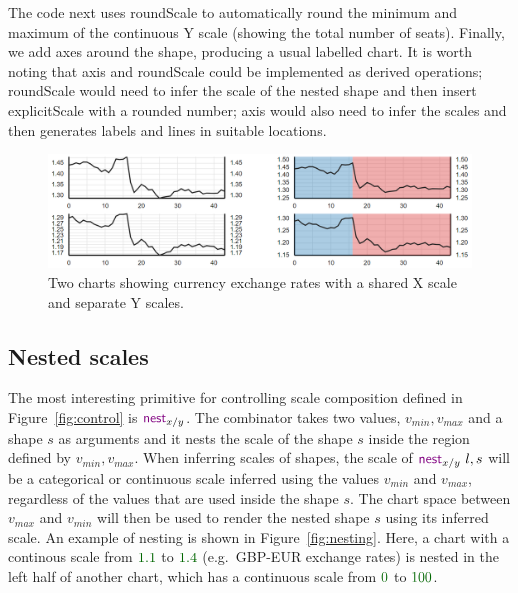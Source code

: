 \documentclass{jfp}
\newcommand{\num}[1]{\textcolor{numclr}{#1}}
\newcommand{\kvd}[1]{\textnormal{\textcolor{kvdclr}{\sffamily #1}}}
\begin{document}
The code next uses \kvd{roundScale} to automatically round the minimum and maximum of the
continuous Y scale (showing the total number of seats). Finally, we add axes around the shape,
producing a usual labelled chart.  It is worth noting that \kvd{axis} and \kvd{roundScale}
could be implemented as derived operations; \kvd{roundScale} would need to infer the scale of
the nested shape and then insert \kvd{explicitScale} with a rounded number; \kvd{axis}
would also need to infer the scales and then generates labels and lines in suitable locations.

\begin{figure}
\includegraphics[scale=0.57]{figures/lines}
\vspace{0.25em}
\caption{Two charts showing currency exchange rates with a shared X scale and separate Y scales.}
\label{fig:lines}
\end{figure}

\subsection{Nested scales}

The most interesting primitive for controlling scale composition defined in Figure~\ref{fig:control}
is $\kvd{nest}_{x/y}$. The combinator takes two values, $v_{min}, v_{max}$ and a shape $s$ as arguments
and it nests the scale of the shape $s$ inside the region defined by $v_{min}, v_{max}$. When inferring
scales of shapes, the scale of $\kvd{nest}_{x/y}~l, s$ will be a categorical or continuous scale
inferred using the values $v_{min}$ and $v_{max}$, regardless of the values that are used inside
the shape $s$. The chart space between $v_{max}$ and $v_{min}$ will then be used to render the
nested shape $s$ using its inferred scale. An example of nesting is shown in Figure~\ref{fig:nesting}.
Here, a chart with a continous scale from $\num{1.1}$ to $\num{1.4}$ (e.g.~GBP-EUR exchange rates)
is nested in the left half of another chart, which has a continuous scale from $\num{0}$ to $\num{100}$.
\end{document}
